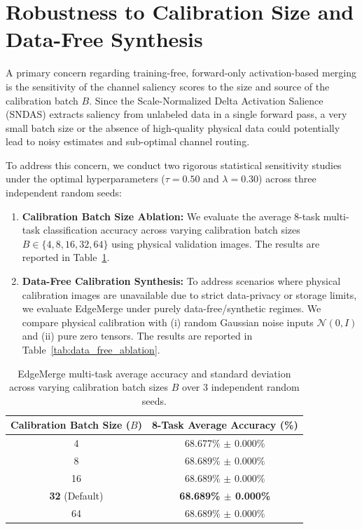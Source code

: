 \documentclass{article}
\theoremstyle{plain}
\theoremstyle{definition}
\theoremstyle{remark}
\begin{document}
\section{Robustness to Calibration Size and Data-Free Synthesis}
\label{app:calibration_size}

A primary concern regarding training-free, forward-only activation-based merging is the sensitivity of the channel saliency scores to the size and source of the calibration batch $B$. Since the Scale-Normalized Delta Activation Salience (SNDAS) extracts saliency from unlabeled data in a single forward pass, a very small batch size or the absence of high-quality physical data could potentially lead to noisy estimates and sub-optimal channel routing.

To address this concern, we conduct two rigorous statistical sensitivity studies under the optimal hyperparameters ($\tau = 0.50$ and $\lambda = 0.30$) across three independent random seeds:
\begin{enumerate}
    \item \textbf{Calibration Batch Size Ablation:} We evaluate the average 8-task multi-task classification accuracy across varying calibration batch sizes $B \in \{4, 8, 16, 32, 64\}$ using physical validation images. The results are reported in Table~\ref{tab:calibration_ablation}.
    \item \textbf{Data-Free Calibration Synthesis:} To address scenarios where physical calibration images are unavailable due to strict data-privacy or storage limits, we evaluate EdgeMerge under purely data-free/synthetic regimes. We compare physical calibration with (i) random Gaussian noise inputs $\mathcal{N}(0, I)$ and (ii) pure zero tensors. The results are reported in Table~\ref{tab:data_free_ablation}.
\end{enumerate}

\begin{table}[h]
\caption{EdgeMerge multi-task average accuracy and standard deviation across varying calibration batch sizes $B$ over 3 independent random seeds.}
\label{tab:calibration_ablation}
\vskip 0.15in
\begin{center}
\begin{small}
\begin{sc}
\begin{tabular}{cc}
\toprule
Calibration Batch Size ($B$) & 8-Task Average Accuracy (\%) \\
\midrule
4  & 68.677\% $\pm$ 0.000\% \\
8  & 68.689\% $\pm$ 0.000\% \\
16 & 68.689\% $\pm$ 0.000\% \\
\textbf{32} (Default) & \textbf{68.689\% $\pm$ 0.000\%} \\
64 & 68.689\% $\pm$ 0.000\% \\
\bottomrule
\end{tabular}
\end{sc}
\end{small}
\end{center}
\vskip -0.1in
\end{table}
\end{document}
